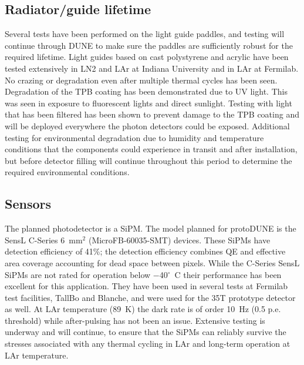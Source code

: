 \subsection{Radiator/guide lifetime}
Several tests have been performed on the light guide paddles, and testing will 
continue through DUNE to make sure the paddles are sufficiently robust for the
required lifetime.
Light guides based on cast polystyrene and acrylic have been tested 
extensively in LN2 and LAr at Indiana University and in LAr at Fermilab.
No crazing or degradation even after multiple thermal cycles has been seen.
Degradation of the TPB coating has been demonstrated due to UV light.
This was seen in exposure to fluorescent lights and direct sunlight.
Testing with light that has been filtered has been shown to prevent damage
to the TPB coating and will be deployed everywhere the photon detectors
could be exposed.
Additional testing for environmental degradation due to humidity and 
temperature conditions that the components could experience in transit and 
after installation, but before detector filling will continue throughout this
period to determine the required environmental conditions.

\subsection{Sensors}
The planned photodetector is a SiPM.  
The model planned for protoDUNE is the SensL C-Series 6~mm$^2$
(MicroFB-60035-SMT) devices. These SiPMs have detection efficiency of
41\%; the detection efficiency combines QE and effective area
  coverage accounting for dead space between pixels. While the
C-Series SensL SiPMs are not rated for operation below
$-$40$^{\circ}$~C their performance has been excellent for this
application. 
They have been used in several tests at Fermilab test facilities,
TallBo and Blanche, and were used for the 35T prototype detector
as well.  At LAr temperature (89~K) the dark rate is of order 10~Hz
(0.5 p.e. threshold) while after-pulsing has not been an
issue. Extensive testing is underway and will continue, to ensure 
that the SiPMs can reliably survive the stresses associated with 
any thermal cycling in LAr and long-term operation at LAr temperature.

